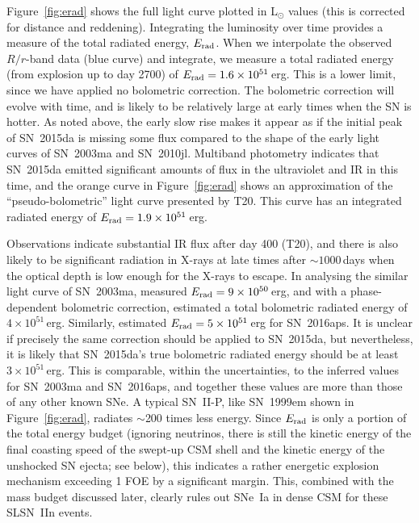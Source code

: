 \documentclass[fleqn,usenatbib,useAMS]{mnras}
\begin{document}
Figure~\ref{fig:erad} shows the full light curve plotted in
L$_{\odot}$ values (this is corrected for distance and reddening).  Integrating the luminosity
over time provides a measure of the total radiated energy, $E_{\rm
  rad}$.  When we interpolate the observed $R/r$-band data (blue curve) and
integrate, we measure a total radiated energy (from explosion up to
day 2700) of $E_{\rm rad} = 1.6 \times 10^{51}$\,erg.  This is a
lower limit, since we have applied no bolometric correction.  The
bolometric correction will evolve with time, and is likely to be
relatively large at early times when the SN is hotter.  As
noted above, the early slow rise makes it appear as if the initial
peak of SN~2015da is missing some flux compared to the shape of the
early light curves of SN~2003ma and SN~2010jl.  Multiband photometry
indicates that SN~2015da emitted significant amounts of flux in the ultraviolet
and IR in this time, and the orange curve in Figure~\ref{fig:erad} shows
an approximation of the ``pseudo-bolometric'' light curve presented
by T20.  This curve has an integrated radiated energy of $E_{\rm rad}
= 1.9 \times 10^{51}$\,erg.


Observations indicate substantial IR flux after day 400 (T20), and
there is also likely to be significant radiation in X-rays at late
times after $\sim 1000$\,days when the optical depth is low enough for
the X-rays to escape.  In analysing the similar light curve of
SN~2003ma, \citet{rest11} measured $E_{\rm rad} = 9 \times 10^{50}$\,erg, and with a phase-dependent bolometric correction, estimated a
total bolometric radiated energy of $4 \times 10^{51}$\,erg.  
Similarly, \citet{nicholl20} estimated $E_{\rm rad} = 5 \times 10^{51}$\,erg  for SN~2016aps.  
It is unclear if precisely the same correction should be applied to SN~2015da, but
nevertheless, it is likely that SN~2015da's true bolometric radiated
energy should be at least $3 \times 10^{51}$\,erg.  This is comparable,
within the uncertainties, to the inferred values for SN~2003ma and SN~2016aps, and together these
values are more than those of any other known SNe.  A typical SN~II-P, like
SN~1999em shown in Figure~\ref{fig:erad}, radiates $\sim$200 times
less energy.  Since $E_{\rm rad}$ is only a portion of the total
energy budget (ignoring neutrinos, there is still the kinetic
energy of the final coasting speed of the swept-up CSM shell and the kinetic energy of the unshocked SN ejecta; see
below), this indicates a rather energetic explosion mechanism
exceeding 1 FOE by a significant margin.  This, combined with the mass
budget discussed later, clearly rules out SNe~Ia in dense CSM for
these SLSN~IIn events.
\end{document}

